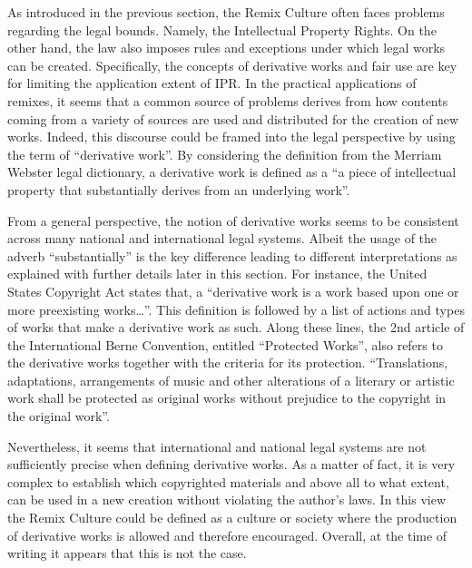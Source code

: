 As introduced in the previous section, the Remix Culture often faces problems regarding the legal bounds. Namely, the Intellectual Property Rights. On the other hand, the law also imposes rules and exceptions under which legal works can be created. Specifically, the concepts of derivative works and fair use are key for limiting the application extent of IPR.
In the practical applications of remixes, it seems that a common source of problems derives from how contents coming from a variety of sources are used and distributed for the creation of new works. Indeed, this discourse could be framed into the legal perspective by using the term of “derivative work”. By considering the definition from the Merriam Webster legal dictionary, a derivative work is defined as a “a piece of intellectual property that substantially derives from an underlying work”.

From a general perspective, the notion of derivative works seems to be consistent across many national and international legal systems. Albeit the usage of the adverb “substantially” is the key difference leading to different interpretations as explained with further details later in this section. 
For instance, the United States Copyright Act states that, a “derivative work is a work based upon one or more preexisting works…”. This definition is followed by a list of actions and types of works that make a derivative work as such.
Along these lines, the 2nd article of the International Berne Convention, entitled “Protected Works”, also refers to the derivative works together with the criteria for its protection. 
“Translations, adaptations, arrangements of music and other alterations of a literary or artistic work shall be protected as original works without prejudice to the copyright in the original work”.

Nevertheless, it seems that international and national legal systems are not sufficiently precise when defining derivative works. As a matter of fact, it is very complex to establish which copyrighted materials and above all to what extent, can be used in a new creation without violating the author’s laws. In this view the Remix Culture could be defined as a culture or society where the production of derivative works is allowed and therefore encouraged. Overall, at the time of writing it appears that this is not the case.

